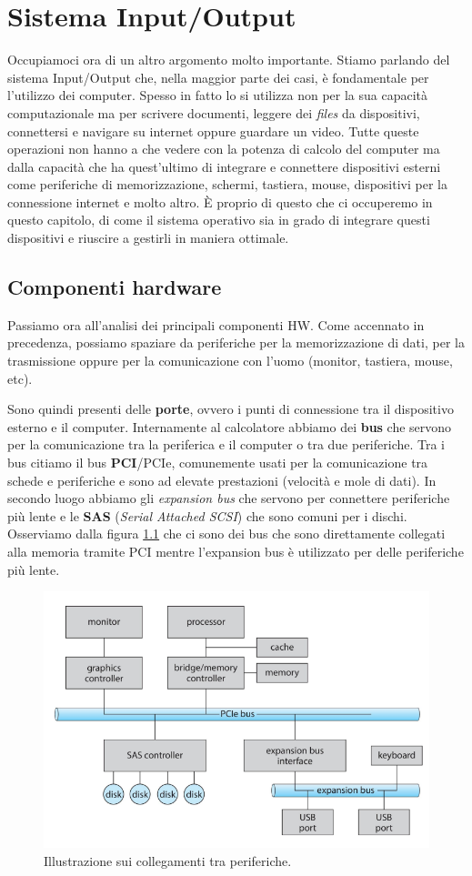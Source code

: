 \pagebreak
\chapter{Sistema Input/Output}
Occupiamoci ora di un altro argomento molto importante. Stiamo parlando del sistema Input/Output che, nella maggior parte dei casi, è fondamentale per l'utilizzo dei computer. Spesso in fatto lo si utilizza non per la sua capacità computazionale ma per scrivere documenti, leggere dei \textit{files} da dispositivi, connettersi e navigare su internet oppure guardare un video. Tutte queste operazioni non hanno a che vedere con la potenza di calcolo del computer ma dalla capacità che ha quest'ultimo di integrare e connettere dispositivi esterni come periferiche di memorizzazione, schermi, tastiera, mouse, dispositivi per la connessione internet e molto altro. È proprio di questo che ci occuperemo in questo capitolo, di come il sistema operativo sia in grado di integrare questi dispositivi e riuscire a gestirli in maniera ottimale.

\section{Componenti hardware}
Passiamo ora all'analisi dei principali componenti HW. Come accennato in precedenza, possiamo spaziare da periferiche per la memorizzazione di dati, per la trasmissione oppure per la comunicazione con l'uomo (monitor, tastiera, mouse, etc).

Sono quindi presenti delle \textbf{porte}, ovvero i punti di connessione tra il dispositivo esterno e il computer. Internamente al calcolatore abbiamo dei \textbf{bus} che servono per la comunicazione tra la periferica e il computer o tra due periferiche. Tra i bus citiamo il bus \textbf{PCI}/PCIe, comunemente usati per la comunicazione tra schede e periferiche e sono ad elevate prestazioni (velocità e mole di dati). In secondo luogo abbiamo gli \textit{expansion bus} che servono per connettere periferiche più lente e le \textbf{SAS} (\textit{Serial Attached SCSI}) che sono comuni per i dischi. Osserviamo dalla figura \ref{fig:busses} che ci sono dei bus che sono direttamente collegati alla memoria tramite PCI mentre l'expansion bus è utilizzato per delle periferiche più lente.
\begin{figure}[h]
    \centering
    \includegraphics[width = .6\textwidth]{../res/imgs/IO system/busses.png}
    \caption{Illustrazione sui collegamenti tra periferiche.}
    \label{fig:busses}
\end{figure}

